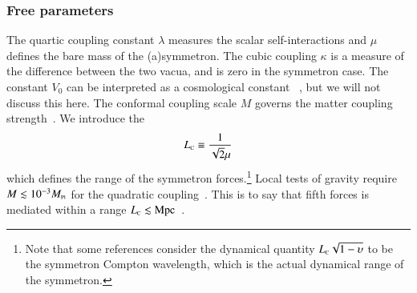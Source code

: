 
    \subsubsection{Free parameters}




    The quartic coupling constant $\lambda$ measures the scalar self-interactions and $\mu$ defines the bare mass of the (a)symmetron. The cubic coupling $\kappa$ is a measure of the difference between the two vacua, and is zero in the symmetron case. The constant $V_0$ can be interpreted as a cosmological constant \textLambda~\citep{christiansenAsevolutionRelativisticNbody2023}, but we will not discuss this here. The conformal coupling scale $M$ governs the matter coupling strength~\citep{burrageAccurateComputationScreening2024}. We introduce the 
    \begin{equation}\label{eq:cosmo:quintessence:symmetron_Compton_wavelength}
        L_{\text{\tiny{C}}} \equiv \frac{1}{\sqrt{2}\mu}
    \end{equation}
    which defines the range of the symmetron forces.\footnote{
        Note that some references consider the dynamical quantity $L_{\text{\tiny{C}}}\sqrt{1-\upsilon}$ to be the symmetron Compton wavelength, which is the actual dynamical range of the symmetron.
    } %
    Local tests of gravity require $M \lesssim 10^{-3} M_{\text{\tiny{Pl}}}$ for the quadratic coupling~\citep{burrageAccurateComputationScreening2024,hinterbichlerSymmetronCosmology2011,hinterbichlerScreeningLongRangeForces2010,hagalaCosmicTsunamisModified2017}. This is to say that fifth forces is mediated within a range $L_{\text{\tiny{C}}}\lesssim\mathrm{Mpc}$~\citep{hinterbichlerScreeningLongRangeForces2010}.



    








    








    